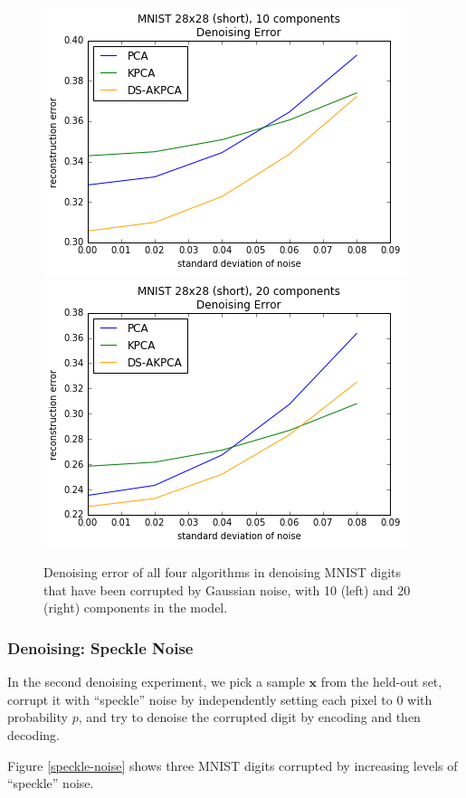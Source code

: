 \documentclass[]{article}
\begin{document}
\begin{figure}[h]
\begin{center}
\includegraphics[scale=0.5]{figures/mnist_28_short_denoise_k10}
\includegraphics[scale=0.5]{figures/mnist_28_short_denoise_k20}
\caption{Denoising error of all four algorithms in denoising MNIST digits that have been corrupted by Gaussian noise, with 10 (left) and 20 (right) components in the model.}
\label{gaussian-denoising}
\end{center}
\end{figure}


\subsubsection{Denoising: Speckle Noise}

In the second denoising experiment, we pick a sample $\mathbf{x}$ from the held-out set, corrupt it with ``speckle'' noise \cite{mika1999} by independently setting each pixel to $0$ with probability $p$, and try to denoise the corrupted digit by encoding and then decoding.

Figure \ref{speckle-noise} shows three MNIST digits corrupted by increasing levels of ``speckle'' noise.
\end{document}
